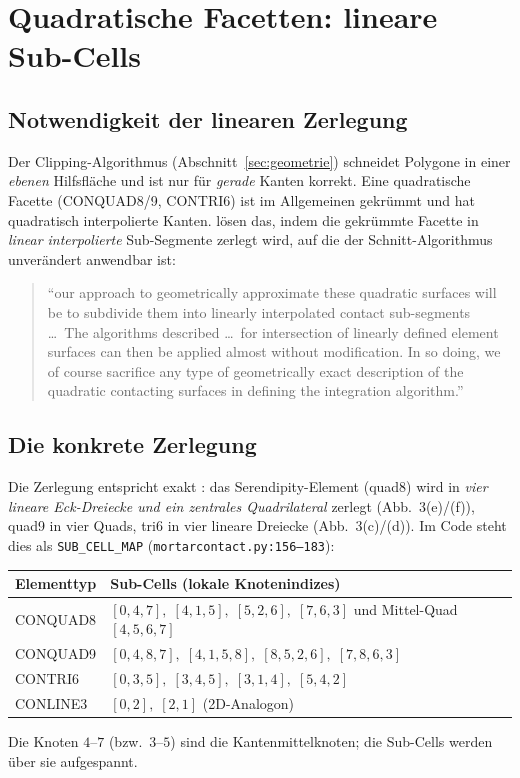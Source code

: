 \documentclass[a4paper,11pt]{article}
\newcommand{\code}[1]{\texttt{\small #1}}
\newcommand{\file}[1]{\texttt{\small #1}}
\let\stdsection\section
\renewcommand{\section}{\clearpage\stdsection}
\begin{document}
\section{Quadratische Facetten: lineare Sub-Cells}
\label{sec:subcells}

\subsection{Notwendigkeit der linearen Zerlegung}
Der Clipping-Algorithmus (Abschnitt~\ref{sec:geometrie}) schneidet Polygone in einer \emph{ebenen}
Hilfsfläche und ist nur für \emph{gerade} Kanten korrekt. Eine quadratische Facette (CONQUAD8/9,
CONTRI6) ist im Allgemeinen gekrümmt und hat quadratisch interpolierte Kanten.
\citet{puso2008} lösen das, indem die gekrümmte Facette in \emph{linear interpolierte} Sub-Segmente
zerlegt wird, auf die der Schnitt-Algorithmus unverändert anwendbar ist:
\begin{quote}
\small ``our approach to geometrically approximate these quadratic surfaces will be to subdivide them
into linearly interpolated contact sub-segments \ldots\ The algorithms described \ldots\ for
intersection of linearly defined element surfaces can then be applied almost without modification. In
so doing, we of course sacrifice any type of geometrically exact description of the quadratic
contacting surfaces in defining the integration algorithm.'' \hfill \citep[S.~560--561]{puso2008}
\end{quote}

\subsection{Die konkrete Zerlegung}
Die Zerlegung entspricht exakt \citet[Abb.~3]{puso2008}: das Serendipity-Element (quad8) wird in
\emph{vier lineare Eck-Dreiecke und ein zentrales Quadrilateral} zerlegt (Abb.~3(e)/(f)), quad9 in
vier Quads, tri6 in vier lineare Dreiecke (Abb.~3(c)/(d)). Im Code steht dies als \code{SUB\_CELL\_MAP}
(\file{mortarcontact.py:\allowbreak{}156--183}):
\begin{center}
\small
\begin{tabular}{ll}
\toprule
Elementtyp & Sub-Cells (lokale Knotenindizes) \\
\midrule
CONQUAD8 & $[0,4,7],\;[4,1,5],\;[5,2,6],\;[7,6,3]$ und Mittel-Quad $[4,5,6,7]$ \\
CONQUAD9 & $[0,4,8,7],\;[4,1,5,8],\;[8,5,2,6],\;[7,8,6,3]$ \\
CONTRI6  & $[0,3,5],\;[3,4,5],\;[3,1,4],\;[5,4,2]$ \\
CONLINE3 & $[0,2],\;[2,1]$ (2D-Analogon) \\
\bottomrule
\end{tabular}
\end{center}
Die Knoten $4$--$7$ (bzw.\ $3$--$5$) sind die Kantenmittelknoten; die Sub-Cells werden über sie
aufgespannt.
\end{document}
